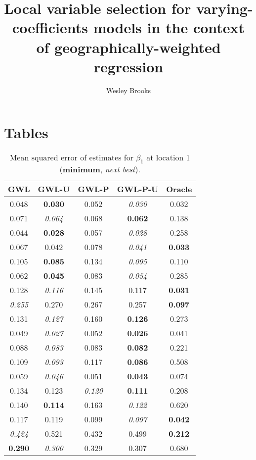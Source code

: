 \documentclass[authoryear, review, 11pt]{elsarticle}
\title{Local variable selection for varying-coefficients models in the context of geographically-weighted regression}
\author{Wesley Brooks}
\date{}                                           %
\begin{document}

\section{Tables}
\begin{table}[ht]
\begin{center}
\begin{tabular}{ccccc}
 GWL & GWL-U & GWL-P & GWL-P-U & Oracle \\ 
  \hline
0.048 & \textbf{0.030} & 0.052 & \emph{0.030} & 0.032 \\ 
  0.071 & \emph{0.064} & 0.068 & \textbf{0.062} & 0.138 \\ 
  0.044 & \textbf{0.028} & 0.057 & \emph{0.028} & 0.258 \\ 
  0.067 & 0.042 & 0.078 & \emph{0.041} & \textbf{0.033} \\ 
  0.105 & \textbf{0.085} & 0.134 & \emph{0.095} & 0.110 \\ 
  0.062 & \textbf{0.045} & 0.083 & \emph{0.054} & 0.285 \\ 
  0.128 & \emph{0.116} & 0.145 & 0.117 & \textbf{0.031} \\ 
  \emph{0.255} & 0.270 & 0.267 & 0.257 & \textbf{0.097} \\ 
  0.131 & \emph{0.127} & 0.160 & \textbf{0.126} & 0.273 \\ 
  0.049 & \emph{0.027} & 0.052 & \textbf{0.026} & 0.041 \\ 
  0.088 & \emph{0.083} & 0.083 & \textbf{0.082} & 0.221 \\ 
  0.109 & \emph{0.093} & 0.117 & \textbf{0.086} & 0.508 \\ 
  0.059 & \emph{0.046} & 0.051 & \textbf{0.043} & 0.074 \\ 
  0.134 & 0.123 & \emph{0.120} & \textbf{0.111} & 0.208 \\ 
  0.140 & \textbf{0.114} & 0.163 & \emph{0.122} & 0.620 \\ 
  0.117 & 0.119 & 0.099 & \emph{0.097} & \textbf{0.042} \\ 
  \emph{0.424} & 0.521 & 0.432 & 0.499 & \textbf{0.212} \\ 
  \textbf{0.290} & \emph{0.300} & 0.329 & 0.307 & 0.680 \\ 
  \end{tabular}
\caption{Mean squared error of estimates for $\beta_1$ at location 1 (\textbf{minimum}, \emph{next best}).\label{MSEX-nonzero}}
\end{center}
\end{table}
\end{document}
